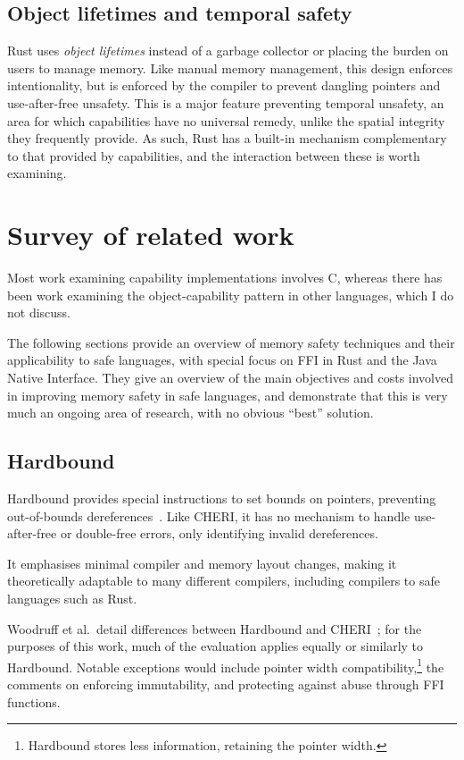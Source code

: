 \documentclass[dissertation.tex]{subfiles}
\begin{document}
\subsection{Object lifetimes and temporal safety}
Rust uses \emph{object lifetimes} instead of a garbage collector or
placing the burden on users to manage memory.
Like manual memory management, this design enforces intentionality, but
is enforced by the compiler to prevent dangling pointers and
use-after-free unsafety.
This is a major feature preventing temporal unsafety, an area for which
capabilities have no universal remedy, unlike the spatial integrity they
frequently provide.
As such, Rust has a built-in mechanism complementary to that provided by
capabilities, and the interaction between these is worth examining.


\section{Survey of related work}
\label{sec:bg-related}

Most work examining capability implementations involves C, whereas there
has been work examining the object-capability pattern in other languages,
which I do not discuss.

The following sections provide an overview of memory safety techniques
and their applicability to safe languages, with special focus on FFI in
Rust and the Java Native Interface.
They give an overview of the main objectives and costs involved in
improving memory safety in safe languages, and demonstrate that this is
very much an ongoing area of research, with no obvious ``best'' solution.


\subsection{Hardbound}
\label{sec:rel-hardbound}

Hardbound provides special instructions to set bounds on pointers,
preventing out-of-bounds dereferences~\cite{devietti-hardbound}.
Like CHERI, it has no mechanism to handle use-after-free or double-free
errors, only identifying invalid dereferences.

It emphasises minimal compiler and memory layout changes, making it
theoretically adaptable to many different compilers, including compilers
to safe languages such as Rust.

Woodruff et al.\ detail differences between Hardbound and
CHERI~\cite{cheri-risc-2014}; for the purposes of this work, much of the
evaluation applies equally or similarly to Hardbound.
Notable exceptions would include pointer width compatibility,\footnote{
Hardbound stores less information, retaining the pointer width.
} the comments on enforcing immutability, and protecting against abuse
through FFI functions.
\end{document}
